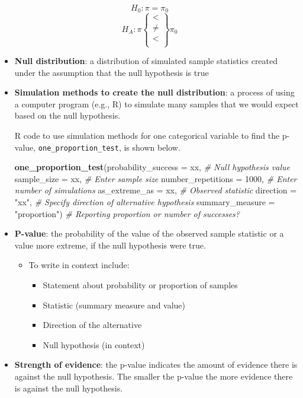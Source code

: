 \documentclass[
]{report}
\newenvironment{Shaded}{\begin{snugshade}}{\end{snugshade}}
\newcommand{\AttributeTok}[1]{\textcolor[rgb]{0.13,0.29,0.53}{#1}}
\newcommand{\CommentTok}[1]{\textcolor[rgb]{0.56,0.35,0.01}{\textit{#1}}}
\newcommand{\DecValTok}[1]{\textcolor[rgb]{0.00,0.00,0.81}{#1}}
\newcommand{\FunctionTok}[1]{\textcolor[rgb]{0.13,0.29,0.53}{\textbf{#1}}}
\newcommand{\NormalTok}[1]{#1}
\newcommand{\StringTok}[1]{\textcolor[rgb]{0.31,0.60,0.02}{#1}}
\begin{document}
\[H_0: \pi = \pi_0\]
\[H_A: \pi \left\{
\begin{array}{ll}
< \\
\ne \\
< \\
\end{array}
\right\}
\pi_0 \]

\begin{itemize}
\item
  \textbf{Null distribution}: a distribution of simulated sample statistics created under the assumption that the null hypothesis is true
\item
  \textbf{Simulation methods to create the null distribution}: a process of using a computer program (e.g., R) to simulate many samples that we would expect based on the null hypothesis.

  R code to use simulation methods for one categorical variable to find the p-value, \texttt{one\_proportion\_test}, is shown below.

\begin{Shaded}
\begin{Highlighting}[]
\FunctionTok{one\_proportion\_test}\NormalTok{(}\AttributeTok{probability\_success =}\NormalTok{ xx, }\CommentTok{\# Null hypothesis value}
      \AttributeTok{sample\_size =}\NormalTok{ xx, }\CommentTok{\# Enter sample size}
      \AttributeTok{number\_repetitions =} \DecValTok{1000}\NormalTok{, }\CommentTok{\# Enter number of simulations}
      \AttributeTok{as\_extreme\_as =}\NormalTok{ xx, }\CommentTok{\# Observed statistic}
      \AttributeTok{direction =} \StringTok{"xx"}\NormalTok{, }\CommentTok{\# Specify direction of alternative hypothesis}
      \AttributeTok{summary\_measure =} \StringTok{"proportion"}\NormalTok{) }\CommentTok{\# Reporting proportion or number of successes?}
\end{Highlighting}
\end{Shaded}
\item
  \textbf{P-value}: the probability of the value of the observed sample statistic or a value more extreme, if the null hypothesis were true.

  \begin{itemize}
  \item
    To write in context include:

    \begin{itemize}
    \item
      Statement about probability or proportion of samples
    \item
      Statistic (summary measure and value)
    \item
      Direction of the alternative
    \item
      Null hypothesis (in context)
    \end{itemize}
  \end{itemize}
\item
  \textbf{Strength of evidence}: the p-value indicates the amount of evidence there is against the null hypothesis. The smaller the p-value the more evidence there is against the null hypothesis.
\end{itemize}
\end{document}
